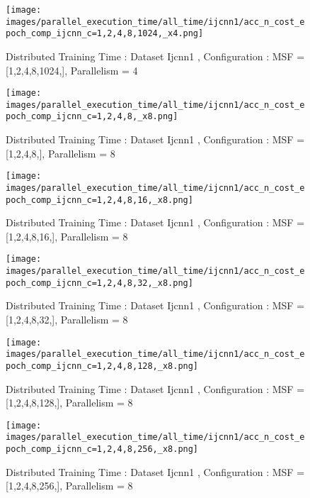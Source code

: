 \begin{figure*}[htbp]
\centering
\texttt{[image: images/parallel\_execution\_time/all\_time/ijcnn1/acc\_n\_cost\_epoch\_comp\_ijcnn\_c=1,2,4,8,1024,\_x4.png]}
\caption{Distributed Training Time : Dataset Ijcnn1 , Configuration : MSF = [1,2,4,8,1024,], Parallelism = 4}
\label{fig:dis-msf-tr-time-ijcnn1-x4}
\end{figure*}


\begin{figure*}[htbp]
\centering
\texttt{[image: images/parallel\_execution\_time/all\_time/ijcnn1/acc\_n\_cost\_epoch\_comp\_ijcnn\_c=1,2,4,8,\_x8.png]}
\caption{Distributed Training Time : Dataset Ijcnn1 , Configuration : MSF = [1,2,4,8,], Parallelism = 8}
\label{fig:dis-msf-tr-time-ijcnn1-x8}
\end{figure*}


\begin{figure*}[htbp]
\centering
\texttt{[image: images/parallel\_execution\_time/all\_time/ijcnn1/acc\_n\_cost\_epoch\_comp\_ijcnn\_c=1,2,4,8,16,\_x8.png]}
\caption{Distributed Training Time : Dataset Ijcnn1 , Configuration : MSF = [1,2,4,8,16,], Parallelism = 8}
\label{fig:dis-msf-tr-time-ijcnn1-x8}
\end{figure*}


\begin{figure*}[htbp]
\centering
\texttt{[image: images/parallel\_execution\_time/all\_time/ijcnn1/acc\_n\_cost\_epoch\_comp\_ijcnn\_c=1,2,4,8,32,\_x8.png]}
\caption{Distributed Training Time : Dataset Ijcnn1 , Configuration : MSF = [1,2,4,8,32,], Parallelism = 8}
\label{fig:dis-msf-tr-time-ijcnn1-x8}
\end{figure*}


\begin{figure*}[htbp]
\centering
\texttt{[image: images/parallel\_execution\_time/all\_time/ijcnn1/acc\_n\_cost\_epoch\_comp\_ijcnn\_c=1,2,4,8,128,\_x8.png]}
\caption{Distributed Training Time : Dataset Ijcnn1 , Configuration : MSF = [1,2,4,8,128,], Parallelism = 8}
\label{fig:dis-msf-tr-time-ijcnn1-x8}
\end{figure*}


\begin{figure*}[htbp]
\centering
\texttt{[image: images/parallel\_execution\_time/all\_time/ijcnn1/acc\_n\_cost\_epoch\_comp\_ijcnn\_c=1,2,4,8,256,\_x8.png]}
\caption{Distributed Training Time : Dataset Ijcnn1 , Configuration : MSF = [1,2,4,8,256,], Parallelism = 8}
\label{fig:dis-msf-tr-time-ijcnn1-x8}
\end{figure*}



